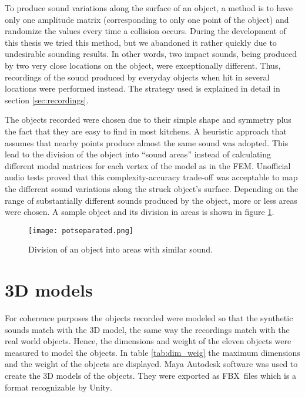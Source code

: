 To produce sound variations along the surface of an object, a method is to have only one amplitude matrix (corresponding to only one point of the object) and randomize the values every time a collision occurs. During the development of this thesis we tried this method, but we abandoned it rather quickly due to undesirable sounding results. In other words, two impact sounds, being produced by two very close locations on the object, were exceptionally different. Thus, recordings of the sound produced by everyday objects when hit in several locations were performed instead. The strategy used is explained in detail in section \ref{sec:recordings}.

The objects recorded were chosen due to their simple shape and symmetry plus the fact that they are easy to find in most kitchens. A heuristic approach that assumes that nearby points produce almost the same sound was adopted. This lead to the division of the object into ``sound areas'' instead of calculating different modal matrices for each vertex of the model as in the \gls{FEM}. Unofficial audio tests proved that this complexity-accuracy trade-off was acceptable to map the different sound variations along the struck object's surface. Depending on the range of substantially different sounds produced by the object, more or less areas were chosen. A sample object and its division in areas is shown in figure \ref{fig:pot_sep}. 

\begin{figure}[H]
  \centering
    \texttt{[image: potseparated.png]}
      \caption{Division of an object into areas with similar sound.}
      \label{fig:pot_sep}
\end{figure} 

\section{3D models}

For coherence purposes the objects recorded were modeled so that the synthetic sounds match with the 3D model, the same way the recordings match with the real world objects. Hence, the dimensions and weight of the eleven objects were measured to model the objects. In table \ref{tab:dim_weig} the maximum dimensions and the weight of the objects are displayed. Maya Autodesk software was used to create the 3D models of the objects. They were exported as FBX\textsuperscript\textregistered\ files \cite{bib:fbx} which is a format recognizable by Unity\textsuperscript{\textregistered}.

